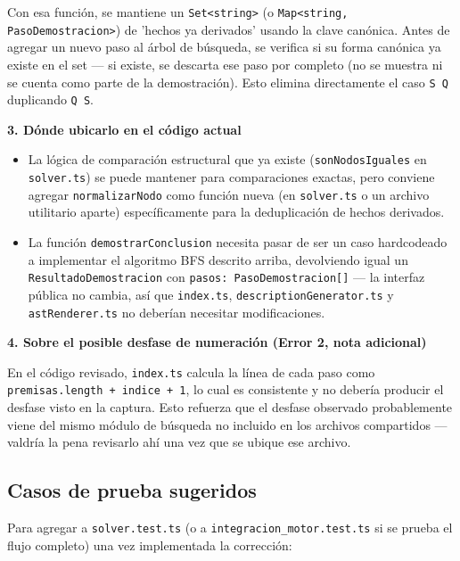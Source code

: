 \documentclass[11pt,a4paper,openany]{book}
\begin{document}
Con esa función, se mantiene un \texttt{Set<string>} (o \texttt{Map<string, PasoDemostracion>}) de 'hechos ya derivados' usando la clave canónica. Antes de agregar un nuevo paso al árbol de búsqueda, se verifica si su forma canónica ya existe en el set --- si existe, se descarta ese paso por completo (no se muestra ni se cuenta como parte de la demostración). Esto elimina directamente el caso \texttt{S  Q} duplicando \texttt{Q  S}.

\textbf{3. Dónde ubicarlo en el código actual}

\begin{itemize}[leftmargin=*]
\item La lógica de comparación estructural que ya existe (\texttt{sonNodosIguales} en \texttt{solver.ts}) se puede mantener para comparaciones exactas, pero conviene agregar \texttt{normalizarNodo} como función nueva (en \texttt{solver.ts} o un archivo utilitario aparte) específicamente para la deduplicación de hechos derivados.
\item La función \texttt{demostrarConclusion} necesita pasar de ser un caso hardcodeado a implementar el algoritmo BFS descrito arriba, devolviendo igual un \texttt{ResultadoDemostracion} con \texttt{pasos: PasoDemostracion[]} --- la interfaz pública no cambia, así que \texttt{index.ts}, \texttt{descriptionGenerator.ts} y \texttt{astRenderer.ts} no deberían necesitar modificaciones.
\end{itemize}

\textbf{4. Sobre el posible desfase de numeración (Error 2, nota adicional)}

En el código revisado, \texttt{index.ts} calcula la línea de cada paso como \texttt{premisas.length + indice + 1}, lo cual es consistente y no debería producir el desfase visto en la captura. Esto refuerza que el desfase observado probablemente viene del mismo módulo de búsqueda no incluido en los archivos compartidos --- valdría la pena revisarlo ahí una vez que se ubique ese archivo.

\hrulefill

\subsection{Casos de prueba sugeridos}

Para agregar a \texttt{solver.test.ts} (o a \texttt{integracion\_motor.test.ts} si se prueba el flujo completo) una vez implementada la corrección:
\end{document}
